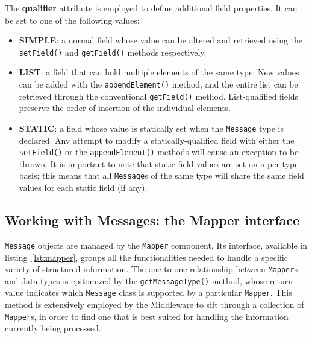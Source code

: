 The \textbf{qualifier} attribute is employed to define additional field
properties. It can be set to one of the following values:

\begin{itemize}

  \item \textbf{SIMPLE}: a normal field whose value can be altered and
      retrieved using the \texttt{setField()} and \texttt{getField()} methods
      respectively.

  \item \textbf{LIST}: a field that can hold multiple elements of the same
      type. New values can be added with the \texttt{appendElement()} method,
      and the entire list can be retrieved through the conventional
      \texttt{getField()} method. List-qualified fields preserve the order of
      insertion of the individual elements.

  \item \textbf{STATIC}: a field whose value is statically set when the
      \texttt{Message} type is declared. Any attempt to modify a
      statically-qualified field with either the \texttt{setField()} or the
      \texttt{appendElement()} methods will cause an exception to be thrown. It
      is important to note that static field values are set on a per-type
      basis; this means that all \texttt{Message}s of the same type will share
      the same field values for each static field (if any).
      
\end{itemize}


\subsection{Working with Messages: the Mapper interface}

\texttt{Message} objects are managed by the \texttt{Mapper} component. Its
interface, available in listing~\ref{lst:mapper}, groups all the
functionalities needed to handle a specific variety of structured information.
The one-to-one relationship between \texttt{Mapper}s and data types is
epitomized by the \texttt{getMessageType()} method, whose return value
indicates which \texttt{Message} class is supported by a particular
\texttt{Mapper}. This method is extensively employed by the Middleware to sift
through a collection of \texttt{Mapper}s, in order to find one that is best
suited for handling the information currently being processed.

